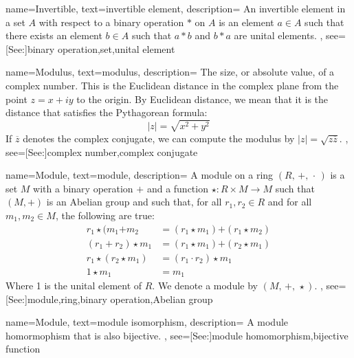 {
    name={Invertible},
    text={invertible element},
    description={
        An invertible element in a set $A$ with respect to a binary
        operation $*$ on $A$ is an element $a\in{A}$ such that there
        exists an element $b\in{A}$ such that $a*b$ and $b*a$ are
        unital elements.
    },
    see=[See:]{binary operation,set,unital element}
}

{
    name={Modulus},
    text={modulus},
    description={
        The size, or absolute value, of a complex number. This is the
        Euclidean distance in the complex plane from the point $z=x+iy$
        to the origin. By Euclidean distance, we mean that it is the
        distance that satisfies the Pythagorean formula:
        \begin{equation*}
            |z|=\sqrt{x^{2}+y^{2}}
        \end{equation*}
        If $\overline{z}$ denotes the complex conjugate, we can compute
        the modulus by $|z|=\sqrt{z\overline{z}}$.
    },
    see=[See:]{complex number,complex conjugate}
}

{
    name={Module},
    text={module},
    description={
        A module on a ring $(R,\,+,\,\cdot\,)$ is a set $M$ with a binary
        operation $\boldsymbol{+}$ and a function
        $\star:R\times{M}\rightarrow{M}$ such that $(M,\boldsymbol{+})$ is
        an Abelian group and such that, for all $r_{1},r_{2}\in{R}$ and for
        all $m_{1},m_{2}\in{M}$, the following are true:
        {%
            \begin{align*}
                r_{1}\star(m_{1}\boldsymbol{+}m_{2}
                &=(r_{1}\star{m}_{1})\boldsymbol{+}(r_{1}\star{m}_{2})\\
                (r_{1}+r_{2})\star{m}_{1}
                &=(r_{1}\star{m}_{1})\boldsymbol{+}(r_{2}\star{m}_{1})\\
                r_{1}\star(r_{2}\star{m}_{1})
                &=(r_{1}\cdot{r}_{2})\star{m}_{1}\\
                1\star{m}_{1}&=m_{1}
            \end{align*}
        }
        Where 1 is the unital element of $R$. We denote a module by
        $(M,\,\boldsymbol{+},\,\star)$.
    },
    see=[See:]{module,ring,binary operation,Abelian group}
}

{
    name={Module},
    text={module isomorphism},
    description={
        A module homormophism that is also bijective.
    },
    see=[See:]{module homomorphism,bijective function}
}

